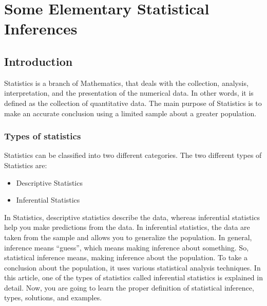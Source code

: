 \chapter{Some Elementary
Statistical Inferences}

\section{Introduction}
Statistics is a branch of Mathematics, that deals with the collection, analysis, interpretation, and the presentation of the numerical data. 
In other words, it is defined as the collection of quantitative data. 
The main purpose of Statistics is to make an accurate conclusion using a limited sample about a greater population.
\par

\subsection{Types of statistics}
Statistics can be classified into two different categories. The two different types of Statistics are:
\begin{itemize}
    \item Descriptive Statistics
    \item Inferential Statistics
\end{itemize}

In Statistics, descriptive statistics describe the data, 
whereas inferential statistics help you make predictions from the data. 
In inferential statistics, the data are taken from the sample and allows you to generalize the population. 
In general, inference means “guess”, which means making inference about something. 
So, statistical inference means, making inference about the population. 
To take a conclusion about the population, it uses various statistical analysis techniques. 
In this article, one of the types of statistics called inferential statistics is explained in detail. 
Now, you are going to learn the proper definition of statistical inference, types, solutions, and examples.

